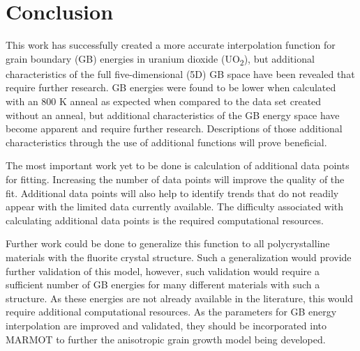 \documentclass[12pt]{report}
\begin{document}
\chapter{Conclusion\label{conclusion}}
This work has successfully created a more accurate interpolation function for grain boundary (GB) energies in uranium dioxide (UO\textsubscript{2}), but additional characteristics of the full five-dimensional (5D) GB space have been revealed that require further research.  GB energies were found to be lower when calculated with an 800 K anneal as expected when compared to the data set created without an anneal, but additional characteristics of the GB energy space have become apparent and require further research.  Descriptions of those additional characteristics through the use of additional functions will prove beneficial.  

The most important work yet to be done is calculation of additional data points for fitting.  Increasing the number of data points will improve the quality of the fit.  Additional data points will also help to identify trends that do not readily appear with the limited data currently available.  The difficulty associated with calculating additional data points is the required computational resources.  %

Further work could be done to generalize this function to all polycrystalline materials with the fluorite crystal structure.  Such a generalization would provide further validation of this model, however, such validation would require a sufficient number of GB energies for many different materials with such a structure.  As these energies are not already available in the literature, this would require additional computational resources.  As the parameters for GB energy interpolation are improved and validated, they should be incorporated into MARMOT to further the anisotropic grain growth model being developed.
\end{document}
